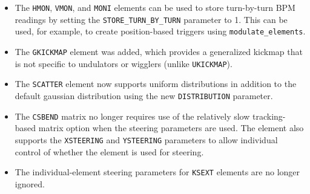 \documentclass[11pt]{article}
\begin{document}
\begin{itemize}
\begin{itemize}
    \end{itemize}
  \item The \verb|HMON|, \verb|VMON|, and \verb|MONI| elements can be used to store turn-by-turn BPM readings by setting
  the \verb|STORE_TURN_BY_TURN| parameter to 1. This can be used, for example, to create position-based triggers using
  \verb|modulate_elements|. 
\item The \verb|GKICKMAP| element was added, which provides a generalized kickmap that is not specific to
  undulators or wigglers (unlike \verb|UKICKMAP|).
\item The \verb|SCATTER| element now supports uniform distributions in addition to the default gaussian distribution
  using the new \verb|DISTRIBUTION| parameter.
\item The \verb|CSBEND| matrix no longer requires use of the relatively slow tracking-based matrix option when
  the steering parameters are used. The element also supports the \verb|XSTEERING| and \verb|YSTEERING| parameters
  to allow individual control of whether the element is used for steering.
\item The individual-element steering parameters for \verb|KSEXT| elements are no longer ignored.
\end{itemize}
\end{document}
